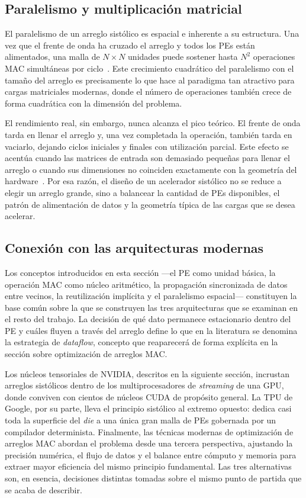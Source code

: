 \documentclass[conference]{IEEEtran}
\begin{document}
\subsection{Paralelismo y multiplicación matricial}

El paralelismo de un arreglo sistólico es espacial e inherente a su estructura. Una vez que el frente de onda ha cruzado el arreglo y todos los PEs están alimentados, una malla de $N \times N$ unidades puede sostener hasta $N^2$ operaciones MAC simultáneas por ciclo~\cite{liao2025nn}. Este crecimiento cuadrático del paralelismo con el tamaño del arreglo es precisamente lo que hace al paradigma tan atractivo para cargas matriciales modernas, donde el número de operaciones también crece de forma cuadrática con la dimensión del problema.

El rendimiento real, sin embargo, nunca alcanza el pico teórico. El frente de onda tarda en llenar el arreglo y, una vez completada la operación, también tarda en vaciarlo, dejando ciclos iniciales y finales con utilización parcial. Este efecto se acentúa cuando las matrices de entrada son demasiado pequeñas para llenar el arreglo o cuando sus dimensiones no coinciden exactamente con la geometría del hardware~\cite{liao2025nn}. Por esa razón, el diseño de un acelerador sistólico no se reduce a elegir un arreglo grande, sino a balancear la cantidad de PEs disponibles, el patrón de alimentación de datos y la geometría típica de las cargas que se desea acelerar.

\subsection{Conexión con las arquitecturas modernas}

Los conceptos introducidos en esta sección ---el PE como unidad básica, la operación MAC como núcleo aritmético, la propagación sincronizada de datos entre vecinos, la reutilización implícita y el paralelismo espacial--- constituyen la base común sobre la que se construyen las tres arquitecturas que se examinan en el resto del trabajo. La decisión de qué dato permanece estacionario dentro del PE y cuáles fluyen a través del arreglo define lo que en la literatura se denomina la estrategia de \textit{dataflow}, concepto que reaparecerá de forma explícita en la sección sobre optimización de arreglos MAC.

Los núcleos tensoriales de NVIDIA, descritos en la siguiente sección, incrustan arreglos sistólicos dentro de los multiprocesadores de \textit{streaming} de una GPU, donde conviven con cientos de núcleos CUDA de propósito general. La TPU de Google, por su parte, lleva el principio sistólico al extremo opuesto: dedica casi toda la superficie del \textit{die} a una única gran malla de PEs gobernada por un compilador determinista. Finalmente, las técnicas modernas de optimización de arreglos MAC abordan el problema desde una tercera perspectiva, ajustando la precisión numérica, el flujo de datos y el balance entre cómputo y memoria para extraer mayor eficiencia del mismo principio fundamental. Las tres alternativas son, en esencia, decisiones distintas tomadas sobre el mismo punto de partida que se acaba de describir.
\end{document}
